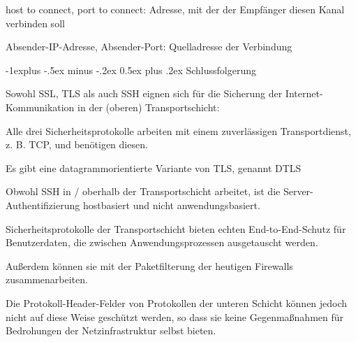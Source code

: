 \documentclass[a4paper]{article}
\makeatletter
\renewcommand{\subsection}{\@startsection{subsection}{2}{0mm}%
 {-1explus -.5ex minus -.2ex}%
 {0.5ex plus .2ex}%
 {\normalfont\normalsize\bfseries}}
\makeatother
\begin{document}
\begin{multicols}{3}
\begin{itemize*}
\begin{itemize*}
\begin{itemize*}
                        \begin{itemize*} \item host to connect, port to connect: Adresse, mit der der Empfänger diesen Kanal verbinden soll \item Absender-IP-Adresse, Absender-Port: Quelladresse der Verbindung \end{itemize*}
                  \end{itemize*}
            \end{itemize*}

            \subsection{Schlussfolgerung}
            \begin{itemize*}
                  \item Sowohl SSL, TLS als auch SSH eignen sich für die Sicherung der
                  Internet-Kommunikation in der (oberen) Transportschicht:
                  \begin{itemize*}
                        \item Alle drei Sicherheitsprotokolle arbeiten mit einem zuverlässigen Transportdienst, z. B. TCP, und benötigen diesen.
                        \item Es gibt eine datagrammorientierte Variante von TLS, genannt DTLS
                        \item Obwohl SSH in / oberhalb der Transportschicht arbeitet, ist die Server-Authentifizierung hostbasiert und nicht anwendungsbasiert.
                        \item Sicherheitsprotokolle der Transportschicht bieten echten End-to-End-Schutz für Benutzerdaten, die zwischen Anwendungsprozessen ausgetauscht werden.
                        \item Außerdem können sie mit der Paketfilterung der heutigen Firewalls zusammenarbeiten.
                        \item Die Protokoll-Header-Felder von Protokollen der unteren Schicht können jedoch nicht auf diese Weise geschützt werden, so dass sie keine Gegenmaßnahmen für Bedrohungen der Netzinfrastruktur selbst bieten.
                  \end{itemize*}
            \end{itemize*}


\end{itemize*}
\end{multicols}
\end{document}
